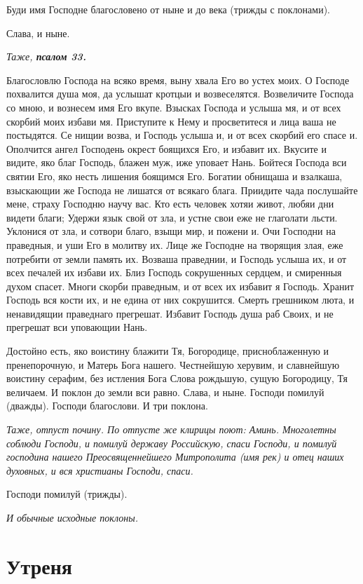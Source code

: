 Буди имя Господне благословено от ныне и до века (трижды с поклонами). 

Слава, и ныне.


\medskip


\itshape Таже, \bfseries псалом 33\normalfont{}.\normalfont{}


Благословлю Господа на всяко время, выну хвала Его во устех моих. О Господе похвалится душа моя, да услышат кротцыи и возвеселятся. Возвеличите Господа со мною, и вознесем имя Его вкупе. Взысках Господа и услыша мя, и от всех скорбий моих избави мя. Приступите к Нему и просветитеся и лица ваша не постыдятся. Се нищии возва, и Господь услыша и, и от всех скорбий его спасе и. Ополчится ангел Господень окрест боящихся Его, и избавит их. Вкусите и видите, яко благ Господь, блажен муж, иже уповает Нань. Бойтеся Господа вси святии Его, яко несть лишения боящимся Его. Богатии обнищаша и взалкаша, взыскающии же Господа не лишатся от всякаго блага. Приидите чада послушайте мене, страху Господню научу вас. Кто есть человек хотяи живот, любяи дни видети благи; Удержи язык свой от зла, и устне свои еже не глаголати льсти. Уклонися от зла, и сотвори благо, взыщи мир, и пожени и. Очи Господни на праведныя, и уши Его в молитву их. Лице же Господне на творящия злая, еже потребити от земли память их. Возваша праведнии, и Господь услыша их, и от всех печалей их избави их. Близ Господь сокрушенных сердцем, и смиренныя духом спасет. Многи скорби праведным, и от всех их избавит я Господь. Хранит Господь вся кости их, и не едина от них сокрушится. Смерть грешником люта, и ненавидящии праведнаго прегрешат. Избавит Господь душа раб Своих, и не прегрешат вси уповающии Нань. 

Достойно есть, яко воистину блажити Тя, Богородице, присноблаженную и пренепорочную, и Матерь Бога нашего. Честнейшую херувим, и славнейшую воистину серафим, без истления Бога Слова рождьшую, сущую Богородицу, Тя величаем. И поклон до земли вси равно. Слава, и ныне. Господи помилуй (дважды). Господи благослови. И три поклона. 


\itshape Таже, отпуст почину. По отпусте же клирицы поют:\normalfont{} Аминь. Многолетны соблюди Господи, и помилуй державу Российскую, спаси Господи, и помилуй господина нашего Преосвященнейшего Митрополита (имя рек) и отец наших духовных, и вся христианы Господи, спаси. 

Господи помилуй (трижды).


\itshape И обычные исходные поклоны.\normalfont{}


\section{Утреня}
 


